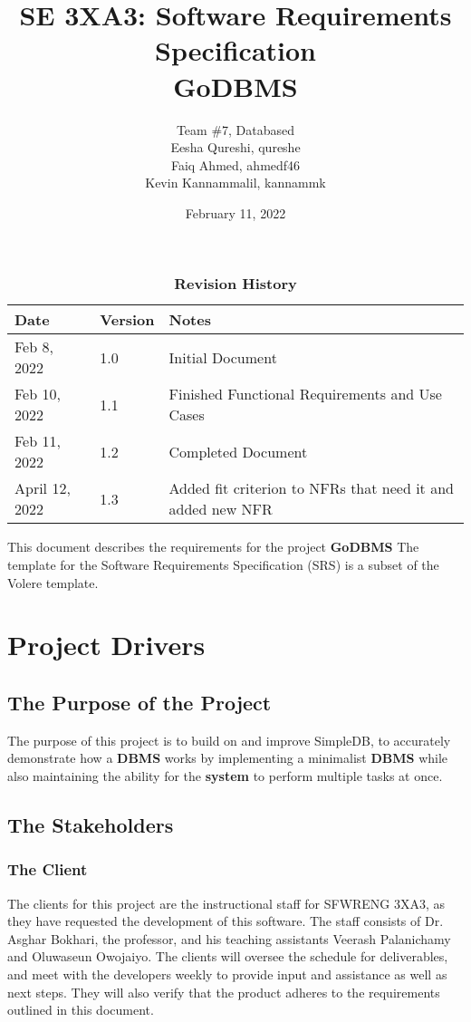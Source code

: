 \documentclass[12pt, titlepage]{article}
\title{SE 3XA3: Software Requirements Specification\\ GoDBMS}
\author{Team \#7, Databased
		\\ Eesha Qureshi, qureshe 
		\\ Faiq Ahmed, ahmedf46 
		\\ Kevin Kannammalil, kannammk
}
\date{February 11, 2022}
\begin{document}
\maketitle

\tableofcontents
\listoftables
\listoffigures

\begin{table}[h!]
\caption{\bf Revision History}
\begin{tabularx}{\textwidth}{p{3cm}p{2cm}X}
\toprule {\bf Date} & {\bf Version} & {\bf Notes}\\
\midrule
Feb 8, 2022 & 1.0 & Initial Document \\
Feb 10, 2022 & 1.1 & Finished Functional Requirements and Use Cases \\
Feb 11, 2022 & 1.2 & Completed Document \\
{\color{red}April 12, 2022} & {\color{red}1.3} & {\color{red}Added fit criterion to NFRs that need it and added new NFR} \\
\bottomrule
\end{tabularx}
\end{table}

\newpage


\noindent This document describes the requirements for the project \textbf{GoDBMS} The template for the Software Requirements Specification (SRS) is a subset of the Volere template.

\section{Project Drivers}

\subsection{The Purpose of the Project}

The purpose of this project is to build on and improve SimpleDB, to accurately demonstrate how a \textbf{DBMS} works by implementing a minimalist \textbf{DBMS} while also maintaining the ability for the \textbf{system} to perform multiple tasks at once.

\subsection{The Stakeholders}

\subsubsection{The Client}
The clients for this project are the instructional staff for SFWRENG 3XA3, as they have requested the development of this software. The staff consists of Dr. Asghar Bokhari, the professor, and his teaching assistants Veerash Palanichamy and Oluwaseun Owojaiyo. The clients will oversee the schedule for deliverables, and meet with the developers weekly to provide input and assistance as well as next steps. They will also verify that the product adheres to the requirements outlined in this document.
\end{document}
